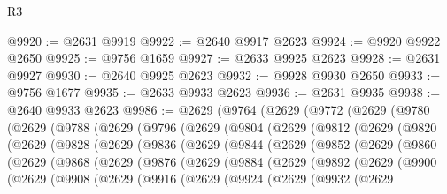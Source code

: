 \begin{lexlean}{R3}
\begin{coremodule}
@9920 := @2631 @9919
@9922 := @2640 @9917 @2623
@9924 := @9920 @9922 @2650
@9925 := @9756 @1659
@9927 := @2633 @9925 @2623
@9928 := @2631 @9927
@9930 := @2640 @9925 @2623
@9932 := @9928 @9930 @2650
@9933 := @9756 @1677
@9935 := @2633 @9933 @2623
@9936 := @2631 @9935
@9938 := @2640 @9933 @2623
@9986 := @2629
    (@9764
      (@2629
        (@9772
          (@2629
            (@9780
              (@2629
                (@9788
                  (@2629
                    (@9796
                      (@2629
                        (@9804
                          (@2629
                            (@9812
                              (@2629
                                (@9820
                                  (@2629
                                    (@9828
                                      (@2629
                                        (@9836
                                          (@2629
                                            (@9844
                                              (@2629
                                                (@9852
                                                  (@2629
                                                    (@9860
                                                      (@2629
                                                        (@9868
                                                          (@2629
                                                            (@9876
                                                              (@2629
                                                                (@9884
                                                                  (@2629
                                                                    (@9892
                                                                      (@2629
                                                                        (@9900
                                                                          (@2629
                                                                            (@9908
                                                                              (@2629
                                                                                (@9916
                                                                                  (@2629
                                                                                    (@9924
                                                                                      (@2629
                                                                                        (@9932
                                                                                          (@2629

\end{coremodule}
\end{lexlean}
